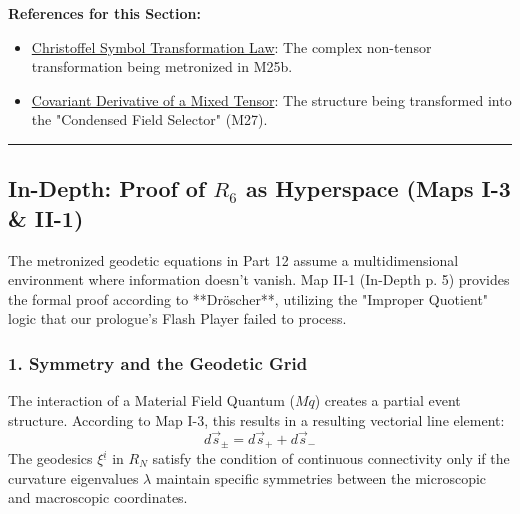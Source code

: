 \documentclass[11pt,a4paper,oneside]{article}
\newenvironment{sectionrefs}
  {\par\vspace{1em}\noindent\textbf{\textsf{References for this Section:}}\begin{itemize}[leftmargin=*, label={\scriptsize$\blacksquare$}, itemsep=2pt]}
  {\end{itemize}}
\newcommand{\hr}{\par\vspace{2em}\noindent\rule{\linewidth}{0.4pt}\par\vspace{2em}}
\begin{document}
\begin{sectionrefs}
    \item \href{https://en.wikipedia.org/wiki/Christoffel_symbols#Transformation_law_under_change_of_variable}{Christoffel Symbol Transformation Law}: The complex non-tensor transformation being metronized in M25b.
    \item \href{https://en.wikipedia.org/wiki/Covariant_derivative}{Covariant Derivative of a Mixed Tensor}: The structure being transformed into the "Condensed Field Selector" (M27).
\end{sectionrefs}

\hr

\subsection*{In-Depth: Proof of $R_6$ as Hyperspace (Maps I-3 \& II-1)}

The metronized geodetic equations in Part 12 assume a multidimensional environment where information doesn't vanish. Map II-1 (In-Depth p. 5) provides the formal proof according to **Dröscher**, utilizing the "Improper Quotient" logic that our prologue's Flash Player failed to process.

\subsubsection*{1. Symmetry and the Geodetic Grid}
The interaction of a Material Field Quantum ($Mq$) creates a partial event structure. According to Map I-3, this results in a resulting vectorial line element:
\begin{equation}
    d\vec{s}_{\pm} = d\vec{s}_{+} + d\vec{s}_{-}
\end{equation}
The geodesics $\xi^{\underline{i}}$ in $R_N$ satisfy the condition of continuous connectivity only if the curvature eigenvalues $\lambda$ maintain specific symmetries between the microscopic and macroscopic coordinates.
\end{document}
